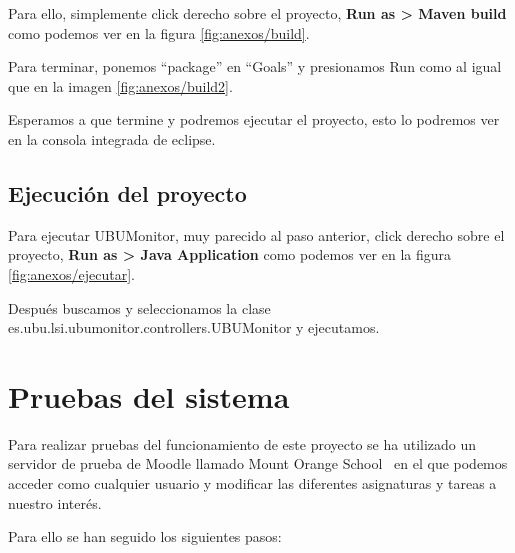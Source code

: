Para ello, simplemente click derecho sobre el proyecto, \textbf{Run as > Maven build} como podemos ver en la figura \ref{fig:anexos/build}.


Para terminar, ponemos ``package'' en ``Goals'' y presionamos Run como al igual que en la imagen \ref{fig:anexos/build2}. 


Esperamos a que termine y podremos ejecutar el proyecto, esto lo podremos ver en la consola integrada de eclipse.
 
\subsection{Ejecución del proyecto}

Para ejecutar UBUMonitor, muy parecido al paso anterior, click derecho sobre el proyecto, \textbf{Run as > Java Application} como podemos ver en la figura \ref{fig:anexos/ejecutar}.


Después buscamos y seleccionamos la clase es.ubu.lsi.ubumonitor.controllers.UBUMonitor y ejecutamos.

\section{Pruebas del sistema}

Para realizar pruebas del funcionamiento de este proyecto se ha utilizado un servidor de prueba de Moodle llamado Mount Orange School~\cite{mountorange:moodle} en el que podemos acceder como cualquier usuario y modificar las diferentes asignaturas y tareas a nuestro interés.

Para ello se han seguido los siguientes pasos:

